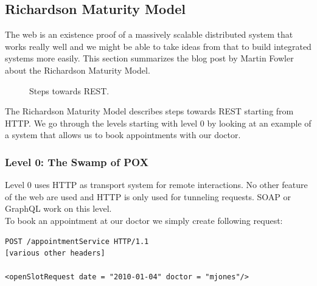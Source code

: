 \subsection{Richardson Maturity Model}\label{richardsonmaturitymodel}

The web is an existence proof of a massively scalable distributed system that works really well and we might be able to take ideas from that to build integrated systems more easily. \citep{rmmfowler} This section summarizes the blog post by Martin Fowler about the Richardson Maturity Model.

\begin{figure}[!htb]
  \caption{\label{fig:my-label} Steps towards REST.}
\end{figure}

The Richardson Maturity Model describes steps towards REST starting from HTTP. We go through the levels starting with level 0 by looking at an example of a system that allows us to book appointments with our doctor.

\subsubsection{Level 0: The Swamp of POX}

Level 0 uses HTTP as transport system for remote interactions. No other feature of the web are used and HTTP is only used for tunneling requests. SOAP or GraphQL work on this level. \\
To book an appointment at our doctor we simply create following request:

\lstset{language=XML}
\begin{lstlisting}[caption=Level 0: Remote procedure call on HTTP]
POST /appointmentService HTTP/1.1
[various other headers]

<openSlotRequest date = "2010-01-04" doctor = "mjones"/>
\end{lstlisting}

